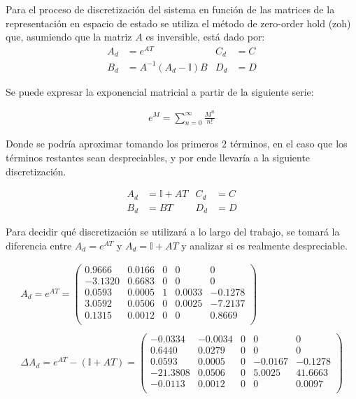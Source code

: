\documentclass[a4paper,10pt]{article}
\begin{document}
Para el proceso de discretización del sistema en función de las matrices de la representación en espacio de estado se utiliza el método de zero-order hold (zoh) que, asumiendo que la matriz $A$ es inversible, \cite{discretizacion-zoh} está dado por:
\begin{align*}
    A_d &= e^{A T} & C_d &= C \\
    B_d &= A^{-1} (A_d - \mathbb{I}) B & D_d &= D
\end{align*}

Se puede expresar la exponencial matricial a partir de la siguiente serie:

\begin{align*}
    e^M = \sum_{n = 0}^{\infty} \frac{M^n}{n!}
\end{align*}

Donde se podría aproximar tomando los primeros $2$ términos, en el caso que los términos restantes sean despreciables, y por ende llevaría a la siguiente discretización. 

\begin{align*}
    A_d &= \mathbb{I} + A T & C_d &= C \\
    B_d &= B T & D_d &= D
\end{align*}

Para decidir qué discretización se utilizará a lo largo del trabajo, se tomará la diferencia entre $A_d = e^{A T}$ y $A_d = \mathbb{I} + A T$ y analizar si es realmente despreciable. 

\begin{gather*}
    A_d = e^{A T} = \begin{pmatrix}
        0.9666 & 0.0166 & 0 &      0 &       0 \\
       -3.1320 & 0.6683 & 0 &      0 &       0 \\
        0.0593 & 0.0005 & 1 & 0.0033 & -0.1278 \\
        3.0592 & 0.0506 & 0 & 0.0025 & -7.2137 \\
        0.1315 & 0.0012 & 0 &      0 &  0.8669 \\
    \end{pmatrix} \\ \\ 
    \Delta A_d = e^{A T} - (\mathbb{I} + A T) = \begin{pmatrix}
       -0.0334 & -0.0034 & 0 &       0 &        0 \\
        0.6440 &  0.0279 & 0 &       0 &        0 \\
        0.0593 &  0.0005 & 0 & -0.0167 &  -0.1278 \\
      -21.3808 &  0.0506 & 0 &  5.0025 &  41.6663 \\
       -0.0113 &  0.0012 & 0 &       0 &   0.0097 \\
    \end{pmatrix} \\ 
\end{gather*}
\end{document}
